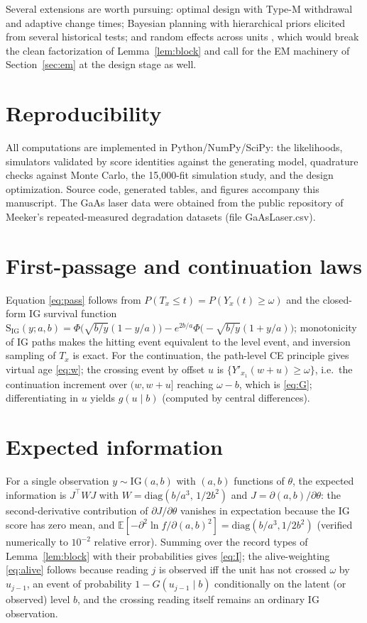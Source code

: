 \documentclass[11pt]{article}
\newcommand{\E}{\mathbb{E}}
\begin{document}
Several extensions are worth pursuing: optimal design with Type-M withdrawal and adaptive
change times; Bayesian planning with hierarchical priors elicited from several historical
tests; and random effects across units \citep[cf.][]{PengTseng2015}, which would break the
clean factorization of Lemma~\ref{lem:block} and call for the EM machinery of
Section~\ref{sec:em} at the design stage as well.

\section*{Reproducibility}

All computations are implemented in Python/NumPy/SciPy: the likelihoods, simulators
validated by score identities against the generating model, quadrature checks against Monte
Carlo, the 15{,}000-fit simulation study, and the design optimization. Source code, generated
tables, and figures accompany this manuscript. The GaAs laser data were obtained from the
public repository of Meeker's repeated-measured degradation datasets (file GaAsLaser.csv).

\appendix

\section{First-passage and continuation laws}\label{app:pass}
Equation \eqref{eq:pass} follows from $P(T_x\le t)=P(Y_x(t)\ge\omega)$ and the closed-form IG
survival function $\mathrm{S}_{\mathrm{IG}}(y;a,b)=\Phi\big(\sqrt{b/y}(1-y/a)\big)
-e^{2b/a}\Phi\big(\!-\!\sqrt{b/y}(1+y/a)\big)$; monotonicity of IG paths makes the hitting
event equivalent to the level event, and inversion sampling of $T_x$ is exact. For the
continuation, the path-level CE principle gives virtual age \eqref{eq:w}; the crossing event
by offset $u$ is $\{Y'_{x_1}(w+u)\ge\omega\}$, i.e.\ the continuation increment over $(w,w+u]$
reaching $\omega-b$, which is \eqref{eq:G}; differentiating in $u$ yields $g(u\mid b)$ (computed
by central differences).

\section{Expected information}\label{app:info}
For a single observation $y\sim\mathrm{IG}(a,b)$ with $(a,b)$ functions of $\theta$, the
expected information is $J^{\top}WJ$ with $W=\mathrm{diag}(b/a^{3},\,1/2b^{2})$ and
$J=\partial(a,b)/\partial\theta$: the second-derivative contribution of $\partial J/\partial\theta$
vanishes in expectation because the IG score has zero mean, and
$\E[-\partial^2\ln f/\partial(a,b)^2]=\mathrm{diag}(b/a^3,1/2b^2)$ (verified numerically to
$10^{-2}$ relative error). Summing over the record types of Lemma~\ref{lem:block} with their
probabilities gives \eqref{eq:I}; the alive-weighting \eqref{eq:alive} follows because reading
$j$ is observed iff the unit has not crossed $\omega$ by $u_{j-1}$, an event of probability
$1-G(u_{j-1}\mid b)$ conditionally on the latent (or observed) level $b$, and the crossing
reading itself remains an ordinary IG observation.
\end{document}
